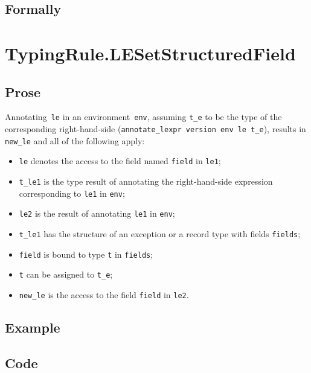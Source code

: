 \documentclass{book}
\begin{document}
\begin{emptyformal}
    \subsection{Formally}
\end{emptyformal}


\section{TypingRule.LESetStructuredField \label{sec:TypingRule.LESetStructuredField}}

    \subsection{Prose}
   Annotating~\texttt{le} in an environment~\texttt{env}, assuming
\texttt{t\_e} to be the type of the corresponding right-hand-side
(\texttt{annotate\_lexpr version env le t\_e}), results in \texttt{new\_le} and
all of the following apply:
   \begin{itemize}
   \item \texttt{le} denotes the access to the field named \texttt{field} in \texttt{le1};
   \item \texttt{t\_le1} is the type result of annotating the right-hand-side expression corresponding to \texttt{le1} in \texttt{env};
   \item \texttt{le2} is the result of annotating \texttt{le1} in \texttt{env};
   \item \texttt{t\_le1} has the structure of an exception or a record type with fields \texttt{fields};
   \item \texttt{field} is bound to type \texttt{t} in \texttt{fields};
   \item \texttt{t} can be assigned to \texttt{t\_e}; 
   \item \texttt{new\_le} is the access to the field \texttt{field} in \texttt{le2}.
   \end{itemize}

  \subsection{Example}

  \subsection{Code}
\end{document}
